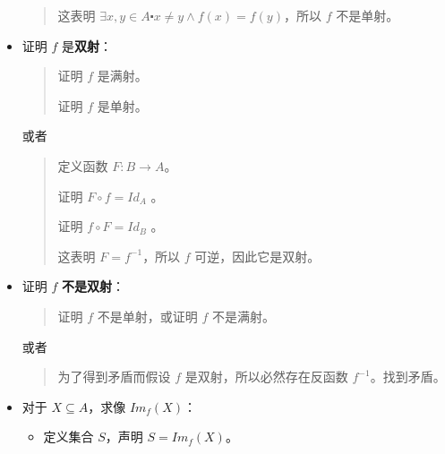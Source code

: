 \begin{itemize}
\begin{quote}
              这表明 $\exists x, y \in A \centerdot x \ne y \land f(x) = f(y)$，所以 $f$ 不是单射。
          \end{quote}
    \item 证明 $f$ 是\textbf{双射}：
          \begin{quote}
              证明 $f$ 是满射。

              证明 $f$ 是单射。
          \end{quote}
          或者
          \begin{quote}
              定义函数 $F:B \to A$。

              证明 $F \circ f = Id_A$ 。

              证明 $f \circ F = Id_B$ 。

              这表明 $F = f^{-1}$，所以 $f$ 可逆，因此它是双射。
          \end{quote}
    \item 证明 $f$ \textbf{不是双射}：
          \begin{quote}
              证明 $f$ 不是单射，或证明 $f$ 不是满射。
          \end{quote}
          或者
          \begin{quote}
              为了得到矛盾而假设 $f$ 是双射，所以必然存在反函数 $f^{-1}$。找到矛盾。
          \end{quote}
    \item 对于 $X \subseteq A$，求像 $Im_f (X)$：
          \begin{itemize}
              \item 定义集合 $S$，声明 $S = Im_f(X)$。


\end{itemize}
\end{itemize}
